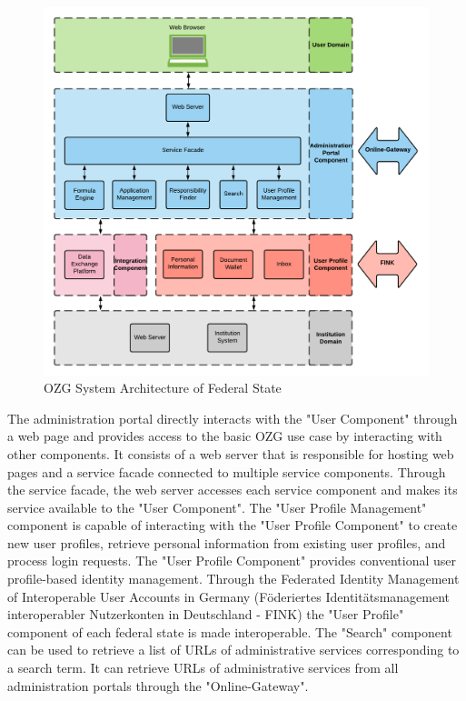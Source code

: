 \begin{figure}[h]
    \centering
    \includegraphics[scale=0.6]{Diagrams/OZG System Overview.pdf}
    \caption{OZG System Architecture of Federal State}
    \label{ozg:system_overview}
\end{figure}

The administration portal directly interacts with the "User Component" through a web page and provides access to the basic OZG use case by interacting with other components. It consists of a web server that is responsible for hosting web pages and a service facade connected to multiple service components. Through the service facade, the web server accesses each service component and makes its service available to the "User Component". 
The "User Profile Management" component is capable of interacting with the "User Profile Component" to create new user profiles, retrieve personal information from existing user profiles, and process login requests. 
The "User Profile Component" provides conventional user profile-based identity management. 
Through the Federated Identity Management of Interoperable User Accounts in Germany (Föderiertes Identitätsmanagement interoperabler Nutzerkonten in Deutschland - FINK) the "User Profile" component of each federal state is made interoperable. The "Search" component can be used to retrieve a list of URLs of administrative services corresponding to a search term. It can retrieve URLs of administrative services from all administration portals through the "Online-Gateway".

